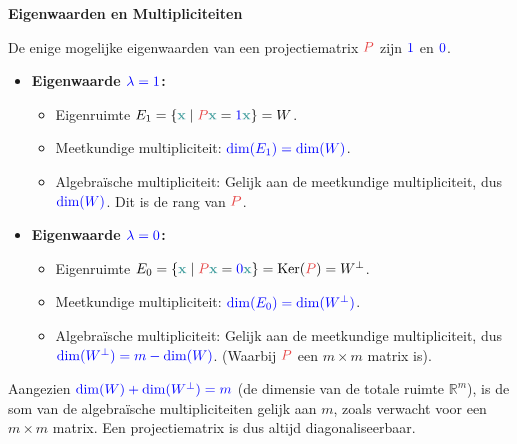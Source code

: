 \documentclass[12pt]{article}
\renewcommand{\vec}[1]{\textcolor{vectorTeal}{\mathbf{#1}}}
\newcommand{\scalar}[1]{\textcolor{scalarBrightBlue}{#1}}
\newcommand{\mat}[1]{\textcolor{matrixSoftRed}{#1}}
\DeclareMathOperator{\Ker}{Ker}
\begin{document}
\vspace{1.5em} %
{\centering
\textcolor{headerBrown}{\large\textbf{Eigenwaarden en Multipliciteiten}}
\par
}%
De enige mogelijke eigenwaarden van een projectiematrix $\mat{P}$ zijn $\scalar{1}$ en $\scalar{0}$.
\begin{itemize}
    \item \textbf{Eigenwaarde $\scalar{\lambda = 1}$:}
        \begin{itemize}
            \item Eigenruimte $E_1 = \{ \vec{x} \mid \mat{P}\vec{x} = \scalar{1}\vec{x} \} = W$.
            \item Meetkundige multipliciteit: $\scalar{\dim(E_1) = \dim(W)}$.
            \item Algebraïsche multipliciteit: Gelijk aan de meetkundige multipliciteit, dus $\scalar{\dim(W)}$. Dit is de rang van $\mat{P}$.
        \end{itemize}
    \item \textbf{Eigenwaarde $\scalar{\lambda = 0}$:}
        \begin{itemize}
            \item Eigenruimte $E_0 = \{ \vec{x} \mid \mat{P}\vec{x} = \scalar{0}\vec{x} \} = \Ker(\mat{P}) = W^{\perp}$.
            \item Meetkundige multipliciteit: $\scalar{\dim(E_0) = \dim(W^{\perp})}$.
            \item Algebraïsche multipliciteit: Gelijk aan de meetkundige multipliciteit, dus $\scalar{\dim(W^{\perp}) = m - \dim(W)}$. (Waarbij $\mat{P}$ een $m \times m$ matrix is).
        \end{itemize}
\end{itemize}
Aangezien $\scalar{\dim(W) + \dim(W^{\perp}) = m}$ (de dimensie van de totale ruimte $\mathbb{R}^m$), is de som van de algebraïsche multipliciteiten gelijk aan $m$, zoals verwacht voor een $m \times m$ matrix. Een projectiematrix is dus altijd diagonaliseerbaar.
\end{document}
